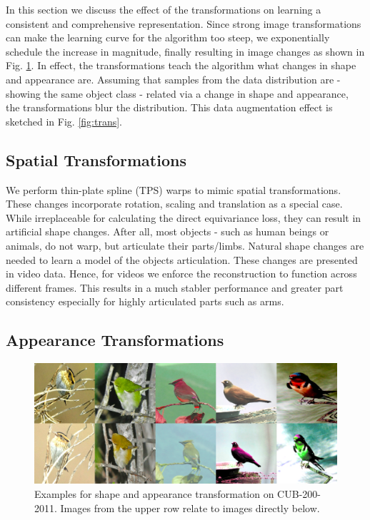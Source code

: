 		In this section we discuss the effect of the transformations on learning a consistent and comprehensive representation.
		Since strong image transformations can make the learning curve for the algorithm too steep, we exponentially schedule the increase in magnitude, finally resulting in image changes as shown in Fig. \ref{fig:coloraugm}.
		In effect, the transformations teach the algorithm what changes in shape and appearance are. Assuming that samples from the data distribution are - showing the same object class - related via a change in shape and appearance, the transformations blur the distribution. This data augmentation effect is sketched in Fig. \ref{fig:trans}.

		\subsection{Spatial Transformations}\label{sec:warps}
			We perform thin-plate spline (TPS) warps to mimic spatial transformations. These changes incorporate rotation, scaling and translation as a special case. While irreplaceable for calculating the direct equivariance loss, they can result in artificial shape changes. After all, most objects - such as human beings or animals, do not warp, but articulate their parts/limbs.
			Natural shape changes are needed to learn a model of the objects articulation. These changes are presented in video data. Hence, for videos we enforce the reconstruction to function across different frames. This results in a much stabler performance and greater part consistency especially for highly articulated parts such as arms.

		\subsection{Appearance Transformations}
			\begin{figure}[htp]
				\centering
				\includegraphics[trim={0cm 0cm 0cm 0cm},clip, width=.8\linewidth]{fig/shape/coloraugm}
				\caption{Examples for shape and appearance transformation on CUB-200-2011. Images from the upper row relate to images directly below.}
				\label{fig:coloraugm}
			\end{figure}

